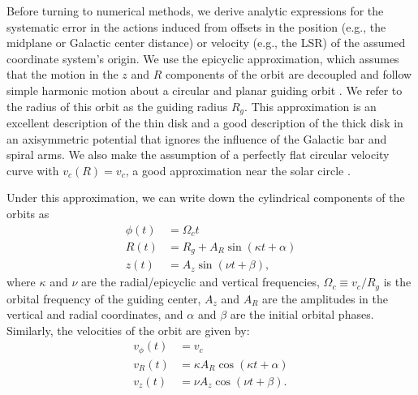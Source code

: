 \documentclass[twocolumn]{aastex62}
\newcommand{\beq}{\begin{equation}}
\newcommand{\eeq}{\end{equation}}
\begin{document}
Before turning to numerical methods, we derive analytic expressions for the
systematic error in the actions induced from offsets in the position (e.g., the midplane or
Galactic center distance) or velocity (e.g., the 
LSR) 
of the assumed coordinate system's origin. We use the epicyclic approximation, which
assumes that the motion in the $z$ and $R$ components of the orbit are
decoupled and follow simple harmonic motion about a circular and planar
guiding orbit 
\citep[][Section~3.2 and references
therein]{2008gady.book.....B}. We refer to the radius of this orbit
as the guiding radius $R_g$.
This approximation is an excellent description
of the thin disk and a good description of the thick disk in
an axisymmetric potential
that ignores
the influence of the Galactic bar and
spiral arms. We also make the assumption of a perfectly flat circular
velocity curve with $v_c(R) = v_c$, a good approximation near the solar circle
\citep[e.g.,][]{2017MNRAS.465...76M}.

Under this approximation, we can write down the cylindrical components
of the orbits as
\beq\label{eq:orbits_epi}
\begin{split}
\phi(t) &= \Omega_c t \\
R(t) &= R_g + A_R \sin{(\kappa t + \alpha)} \\
z(t) &= A_z \sin{(\nu t + \beta)}
\text{,}
\end{split}
\eeq
where $\kappa$ and $\nu$ are the radial/epicyclic and vertical frequencies, $\Omega_c
\equiv v_c/R_g$ is the orbital frequency of the guiding center, $A_z$ and $A_R$ are the amplitudes in the vertical and radial coordinates, and $\alpha$ and
$\beta$ are 
the initial orbital phases.
Similarly, the velocities of the orbit are given by:
\beq\label{eq:orbits_vel_epi}
\begin{split}
v_{\phi}(t) &= v_c \\
v_R(t) &= \kappa A_R \cos{(\kappa t + \alpha)} \\
v_z(t) &= \nu A_z \cos{(\nu t + \beta)}
\text{.}
\end{split}
\eeq
\end{document}
